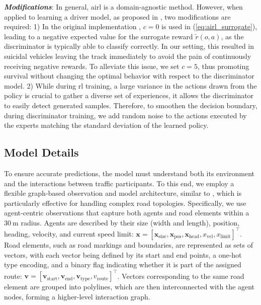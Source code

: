 \documentclass[a4paper,12pt,onecolumn]{article}
\begin{document}
\textbf{\emph{Modifications}}:
In general, \gls{airl} is a domain-agnostic method. However, when applied to learning a driver model, as proposed in \cite{Sackmann22AIRL, Konstantinidis24AIRL}, two modifications are required: 1) In the original implementation \cite{Fu17AIRL}, $c=0$ is used in (\ref{eq:airl_surrogate}), leading to a negative expected value for the surrogate reward $\tilde{r}(o, a)$, as the discriminator is typically able to classify correctly. In our setting, this resulted in suicidal vehicles leaving the track immediately to avoid the pain of continuously receiving negative rewards. To alleviate this issue, we set $c=5$, thus promoting survival without changing the optimal behavior with respect to the discriminator model. 
2) While during \gls{rl} training, a large variance in the actions drawn from the policy is crucial to gather a diverse set of experiences, it allows the discriminator to easily detect generated samples. Therefore, to smoothen the decision boundary, during discriminator training, we add random noise to the actions executed by the experts matching the standard deviation of the learned policy. 


\subsection{Model Details}
To ensure accurate predictions, the model must understand both its environment and the interactions between traffic participants. To this end, we employ a flexible graph-based observation and model architecture, similar to \cite{Konstantinidis24AIRL}, which is particularly effective for handling complex road topologies. 
Specifically, we use agent-centric observations that capture both agents and road elements within a $\SI{30}{\meter}$ radius.  
Agents are described by their size (width and length), position, heading, velocity, and current speed limit: $\mathbf{x} = \left[ \mathbf{x}_\mathrm{size}, \mathbf{x}_\mathrm{pos}, \mathbf{x}_\mathrm{head}, x_\mathrm{vel}, x_\mathrm{limit} \right]^\intercal$. Road elements, such as road markings and boundaries, are represented as sets of vectors, with each vector being defined by its start and end points, a one-hot type encoding, and a binary flag indicating whether it is part of the assigned route: $\mathbf{v} = \left[ \mathbf{v}_\mathrm{start}, \mathbf{v}_\mathrm{end}, \mathbf{v}_\mathrm{type}, v_\mathrm{route} \right]^\intercal$. Vectors corresponding to the same road element are grouped into polylines, which are then interconnected with the agent nodes, forming a higher-level interaction graph. 
\end{document}
